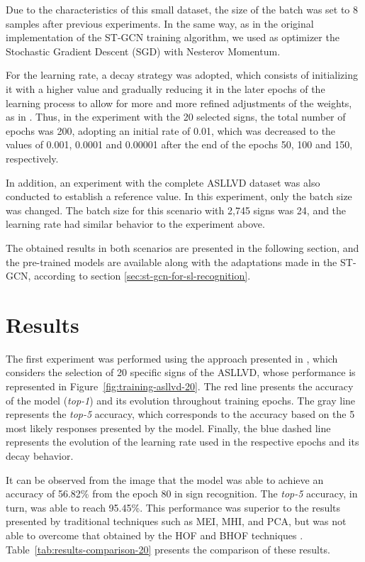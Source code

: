 Due to the characteristics of this small dataset, the size of the batch was set to 8 samples after previous experiments. 
In the same way, as in the original implementation of the ST-GCN training algorithm, we used as optimizer the Stochastic Gradient Descent (SGD) with Nesterov Momentum. 

For the learning rate, a decay strategy was adopted, which consists of initializing it with a higher value and gradually reducing it in the later epochs of the learning process to allow for more and more refined adjustments of the weights, as in \cite{st-gcn-2018}. Thus, in the experiment with the 20 selected signs, the total number of epochs was 200, adopting an initial rate of 0.01, which was decreased to the values of 0.001, 0.0001 and 0.00001 after the end of the epochs 50, 100 and 150, respectively.

In addition, an experiment with the complete ASLLVD dataset was also conducted to establish a reference value. In this experiment, only the batch size was changed. The batch size for this scenario with 2,745 signs was 24, and the learning rate had similar behavior to the experiment above.

The obtained results in both scenarios are presented in the following section, and the pre-trained models are available along with the adaptations made in the ST-GCN, according to section \ref{sec:st-gcn-for-sl-recognition}.


\section{Results} 
\label{sec:results}

The first experiment was performed using the approach presented in \cite{lim-2016}, which considers the selection of 20 specific signs of the ASLLVD, whose performance is represented in Figure~\ref{fig:training-asllvd-20}. The red line presents the accuracy of the model (\textit{top-1}) and its evolution throughout training epochs. The gray line represents the \textit{top-5} accuracy, which corresponds to the accuracy based on the 5 most likely responses presented by the model. Finally, the blue dashed line represents the evolution of the learning rate used in the respective epochs and its decay behavior.

It can be observed from the image that the model was able to achieve an accuracy of 56.82\% from the epoch 80 in sign recognition. The \textit{top-5} accuracy, in turn, was able to reach 95.45\%. This performance was superior to the results presented by traditional techniques such as MEI, MHI, and PCA, but was not able to overcome that obtained by the HOF and BHOF techniques \cite{lim-2016}. Table~\ref{tab:results-comparison-20} presents the comparison of these results.

